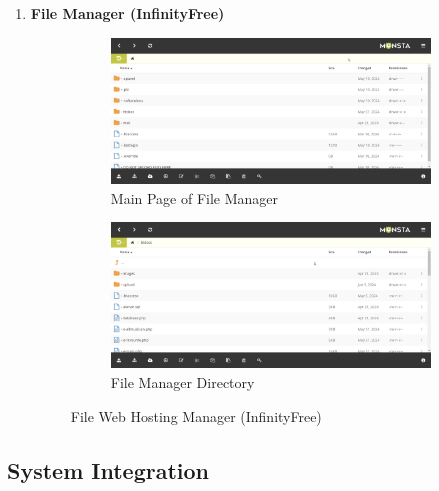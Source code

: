 \begin{enumerate}[1.]
    \item \textbf{File Manager (InfinityFree)}
    \begin{figure}[h]
        \centering
        \begin{subfigure}[b]{1.0\textwidth}
            \centering
            \includegraphics[width=\textwidth]{mainmatter/images/backend/fileman1.png}
            \caption{Main Page of File Manager}
            \vspace{0.8cm}
            \label{fig:sub1}
        \end{subfigure}
        \hspace{0.08\textwidth}
        \begin{subfigure}[b]{1.0\textwidth}
            \centering
            \includegraphics[width=\textwidth]{mainmatter/images/backend/fileman2.png}
            \caption{File Manager Directory}
            \label{fig:sub2}
        \end{subfigure}
        \caption{File Web Hosting Manager (InfinityFree)}
        \label{fig:myfig74a}
    \end{figure}
\end{enumerate}
\clearpage

\subsection{System Integration}

